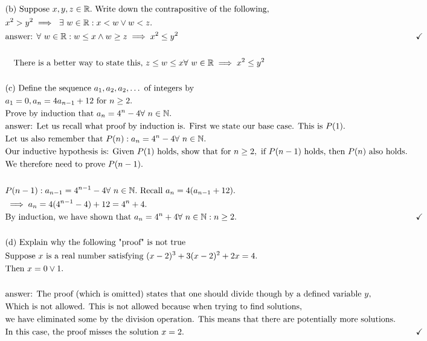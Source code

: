 \documentclass{article}
\begin{document}
        \begin{align*}
            &\\
            &\text{(b) Suppose }x, y, z \in \mathbb{R}. \text{ Write down the contrapositive of the following,}\\
            &x^2 > y^2 \implies ~\exists~ w\in\mathbb{R}: x < w \lor w < z.\\
            &\text{answer: }\forall~ w \in \mathbb{R} : w \leq x \land w \geq z \implies x^2 \leq y^2&\checkmark\\
            &\\
            &\quad\text{There is a better way to state this, }z \leq w \leq x \forall~ w \in \mathbb{R} \implies x^2 \leq y^2 \\
            &\\
            &\text{(c) Define the sequence }a_1, a_2, a_2, \dots\text{ of integers by }\\
            &a_1 = 0, a_n = 4a_{n-1} + 12 \text{ for } n \geq 2.\\
            &\text{Prove by induction that }a_n = 4^n - 4 \forall~ n \in \mathbb{N}.\\
            &\text{answer: Let us recall what proof by induction is. First we state our base case. This is }P(1).\\
            &\text{Let us also remember that }P(n): a_n = 4^n - 4 \forall~ n\in\mathbb{N}.\\
            &\text{Our inductive hypothesis is: Given }P(1)\text{ holds, show that for }n \geq 2, \text{ if }P(n-1) \text{ holds, then } P(n) \text{ also holds.}\\
            &\text{We therefore need to prove }P(n-1).\\
            &\\
            &P(n-1): a_{n-1} = 4^{n-1} - 4 \forall~ n\in \mathbb{N}. \text{ Recall } a_n = 4(a_{n-1} + 12).\\
            &\implies a_n = 4(4^{n-1} - 4) + 12 = 4^n + 4.\\
            &\text{By induction, we have shown that }a_n = 4^n + 4\forall~ n\in \mathbb{N} : n \geq 2. &\checkmark\\
            &\\
            &\text{(d) Explain why the following "proof" is not true}\\
            &\text{Suppose }x \text{ is a real number satisfying } (x-2)^3 + 3(x-2)^2 + 2x = 4.\\
            &\text{Then }x = 0 \lor 1.\\
            &\\
            &\text{answer: The proof (which is omitted) states that one should divide though by a defined variable }y,\\
            &\text{Which is not allowed. This is not allowed because when trying to find solutions,}\\
            &\text{we have eliminated some by the division operation. This means that there are potentially more solutions.}\\
            &\text{In this case, the proof misses the solution }x = 2. &\checkmark\\
        \end{align*}
\end{document}
